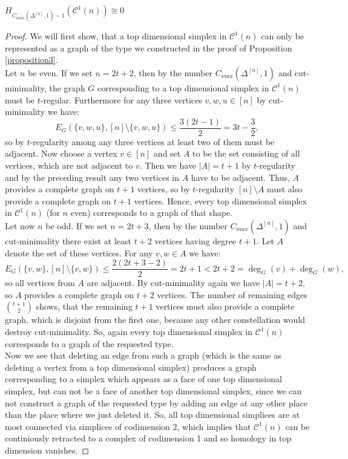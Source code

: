 \begin{thm}\label{theorem3}
\(H_{C_{max}(\Delta^{[n]},1)-1}(\mathcal{C}^1(n))\cong 0\)
\begin{proof}
We will first show, that a top dimensional simplex in \(\mathcal{C}^1(n)\) can only be represented as a graph of the type we constructed in the proof of Proposition \ref{proposition3}.\\
Let \(n\) be even. If we set \(n=2t+2\), then by the number \(C_{max}(\Delta^{[n]},1)\) and cut-minimality, the graph \(G\) corresponding to a top dimensional simplex in \(\mathcal{C}^1(n)\) must be \(t\)-regular. Furthermore for any three vertices \(v,w,u\in [n]\) by cut-minimality we have:
\[
E_G(\{v,w,u\},[n]\setminus\{v,w,u\})\leq\frac{3(2t-1)}{2}=3t-\frac{3}{2},
\]
so by \(t\)-regularity among any three vertices at least two of them must be adjacent. Now choose a vertex \(v\in [n]\) and set \(A\) to be the set consisting of all vertices, which are not adjacent to \(v\). Then we have \(|A|=t+1\) by \(t\)-regularity and by the preceding result any two vertices in \(A\) have to be adjacent. Thus, \(A\) provides a complete graph on \(t+1\) vertices, so by \(t\)-regularity \([n]\setminus A\) must also provide a complete graph on \(t+1\) vertices. Hence, every top dimensional simplex in \(\mathcal{C}^1(n)\) (for \(n\) even) corresponds to a graph of that shape.\\
Let now \(n\) be odd. If we set \(n=2t+3\), then by the number \(C_{max}(\Delta^{[n]},1)\) and cut-minimality there exist at least \(t+2\) vertices having degree \(t+1\). Let \(A\) denote the set of these vertices. For any \(v,w\in A\) we have:
\[
E_G(\{v,w\},[n]\setminus\{v,w\})\leq\frac{2(2t+3-2)}{2}=2t+1<2t+2=\deg_G(v)+\deg_G(w),
\]
so all vertices from \(A\) are adjacent. By cut-minimality again we have \(|A|=t+2\), so \(A\) provides a complete graph on \(t+2\) vertices. The number of remaining edges \(\binom{t+1}{2}\) shows, that the remaining \(t+1\) vertices must also provide a complete graph, which is disjoint from the first one, because any other constellation would destroy cut-minimality. So, again every top dimensional simplex in \(\mathcal{C}^1(n)\) corresponds to a graph of the requested type.\\
Now we see that deleting an edge from such a graph (which is the same as deleting a vertex from a top dimensional simplex) produces a graph corresponding to a simplex which appears as a face of one top dimensional simplex, but can not be a face of another top dimensional simplex, since we can not construct a graph of the requested type by adding an edge at any other place than the place where we just deleted it. So, all top dimensional simplices are at most connected via simplices of codimension 2, which implies that \(\mathcal{C}^1(n)\) can be continiously retracted to a complex of codimension 1 and so homology in top dimension vanishes.
\end{proof}
\end{thm}
